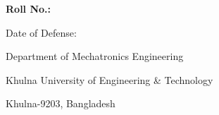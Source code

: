 \begin{titlepage}
\thispagestyle{empty}
\centering
{}

{\fontsize{20}{26}\bfseries \thesistitle \par}

\vspace{7\baselineskip}

{\fontsize{18}{24}\bfseries \studentname \par}
{\fontsize{18}{24}\bfseries Roll No.: \studentroll \par}

\vspace{\baselineskip}

{\fontsize{16}{22}\selectfont Date of Defense:  \par}

\vspace{\baselineskip}

{\fontsize{15}{20}\selectfont Department of Mechatronics Engineering \par}
{\fontsize{15}{20}\selectfont Khulna University of Engineering \& Technology \par}
{\fontsize{15}{20}\selectfont Khulna-9203, Bangladesh \par}

\end{titlepage}
